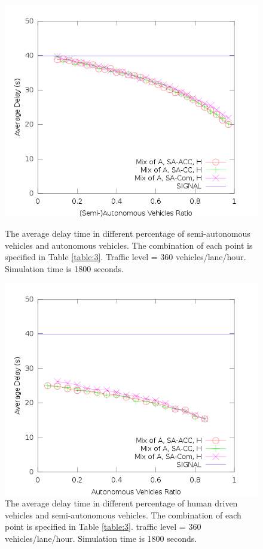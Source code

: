 \begin{figure}
\centering
\includegraphics[width=0.8\columnwidth]{figures/figure_3.png}
\caption{The average delay time in different percentage of semi-autonomous
  vehicles and autonomous vehicles. The combination of each point is
  specified in Table \ref{table:3}. Traffic level = 360 vehicles/lane/hour.
  Simulation time is 1800 seconds.}
\label{fig:figure3}

\mbox{}

\centering
\includegraphics[width=0.8\columnwidth]{figures/figure_4.png}
\caption{The average delay time in different percentage of human
driven vehicles and semi-autonomous vehicles.  The combination of
each point is specified in Table \ref{table:3}.  traffic level = 360
vehicles/lane/hour. Simulation time is 1800 seconds.}
\label{fig:figure4}

\mbox{}


\end{figure}
